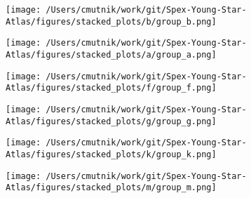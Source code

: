 \begin{figure}[h!]
\begin{center}
\texttt{[image: /Users/cmutnik/work/git/Spex-Young-Star-Atlas/figures/stacked\_plots/b/group\_b.png]}
\caption{ \protect}
\end{center}
\end{figure}


\begin{figure}[h!]
\begin{center}
\texttt{[image: /Users/cmutnik/work/git/Spex-Young-Star-Atlas/figures/stacked\_plots/a/group\_a.png]}
\caption{ \protect}
\end{center}
\end{figure}


\begin{figure}[h!]
\begin{center}
\texttt{[image: /Users/cmutnik/work/git/Spex-Young-Star-Atlas/figures/stacked\_plots/f/group\_f.png]}
\caption{ \protect}
\end{center}
\end{figure}


\begin{figure}[h!]
\begin{center}
\texttt{[image: /Users/cmutnik/work/git/Spex-Young-Star-Atlas/figures/stacked\_plots/g/group\_g.png]}
\caption{ \protect}
\end{center}
\end{figure}


\begin{figure}[h!]
\begin{center}
\texttt{[image: /Users/cmutnik/work/git/Spex-Young-Star-Atlas/figures/stacked\_plots/k/group\_k.png]}
\caption{ \protect}
\end{center}
\end{figure}


\begin{figure}[h!]
\begin{center}
\texttt{[image: /Users/cmutnik/work/git/Spex-Young-Star-Atlas/figures/stacked\_plots/m/group\_m.png]}
\caption{ \protect}
\end{center}
\end{figure}


